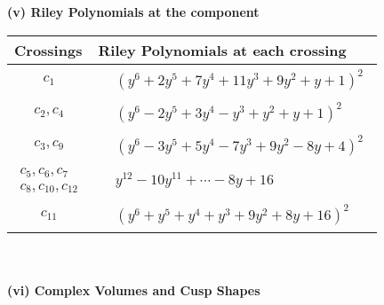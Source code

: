 \documentclass[1p]{elsarticle_modified}
\theoremstyle{definition}
\begin{document}
\newpage\renewcommand{\arraystretch}{1}
\flushleft \textbf{(v) Riley Polynomials at the component}\newline \\
\begin{tabular}{m{50pt}|m{274pt}}
Crossings & \hspace{64pt}Riley Polynomials at each crossing \\
\hline $$\begin{aligned}c_{1}\end{aligned}$$&$\begin{aligned}
&(y^6+2 y^5+7 y^4+11 y^3+9 y^2+y+1)^2
\end{aligned}$\\
\hline $$\begin{aligned}c_{2},c_{4}\end{aligned}$$&$\begin{aligned}
&(y^6-2 y^5+3 y^4- y^3+y^2+y+1)^2
\end{aligned}$\\
\hline $$\begin{aligned}c_{3},c_{9}\end{aligned}$$&$\begin{aligned}
&(y^6-3 y^5+5 y^4-7 y^3+9 y^2-8 y+4)^2
\end{aligned}$\\
\hline $$\begin{aligned}c_{5},c_{6},c_{7}\\c_{8},c_{10},c_{12}\end{aligned}$$&$\begin{aligned}
&y^{12}-10 y^{11}+\cdots-8 y+16
\end{aligned}$\\
\hline $$\begin{aligned}c_{11}\end{aligned}$$&$\begin{aligned}
&(y^6+y^5+y^4+y^3+9 y^2+8 y+16)^2
\end{aligned}$\\
\hline
\end{tabular}\\~\\
\newpage\flushleft \textbf{(vi) Complex Volumes and Cusp Shapes}
\end{document}
